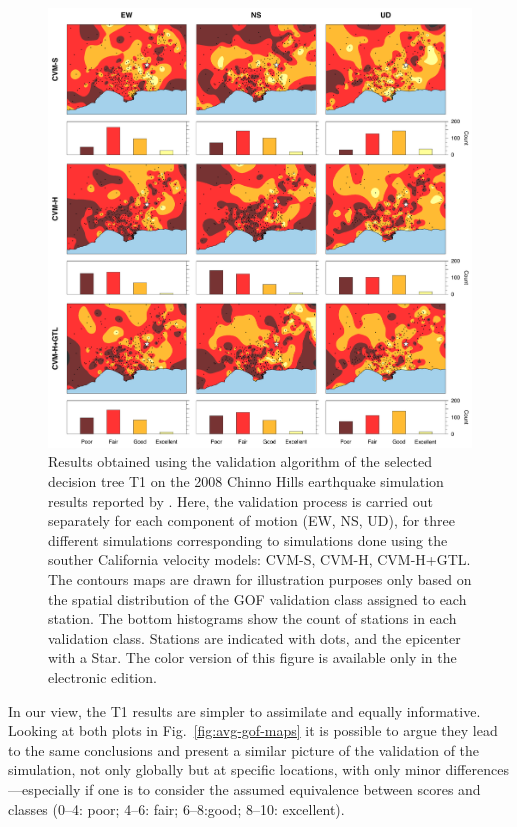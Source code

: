 \begin{figure}%
	\centering
	\includegraphics[width=\textwidth]{figures/pdf/figure-10}
	\caption{Results obtained using the validation algorithm of the selected decision tree T1 on the 2008 Chinno Hills earthquake simulation results reported by \citet{Taborda_2014_BSSA}. Here, the validation process is carried out separately for each component of motion (EW, NS, UD), for three different simulations corresponding to simulations done using the souther California velocity models: CVM-S, CVM-H, CVM-H+GTL. The contours maps are drawn for illustration purposes only based on the spatial distribution of the GOF validation class assigned to each station. The bottom histograms show the count of stations in each validation class. Stations are indicated with dots, and the epicenter with a Star. The color version of this figure is available only in the electronic edition.}
	\label{fig:res-gof-maps}
\end{figure}

In our view, the T1 results are simpler to assimilate and equally informative. Looking at both plots in Fig.~\ref{fig:avg-gof-maps} it is possible to argue they lead to the same conclusions and present a similar picture of the validation of the simulation, not only globally but at specific locations, with only minor differences---especially if one is to consider the assumed equivalence between scores and classes (0--4: poor; 4--6: fair; 6--8:good; 8--10: excellent).

